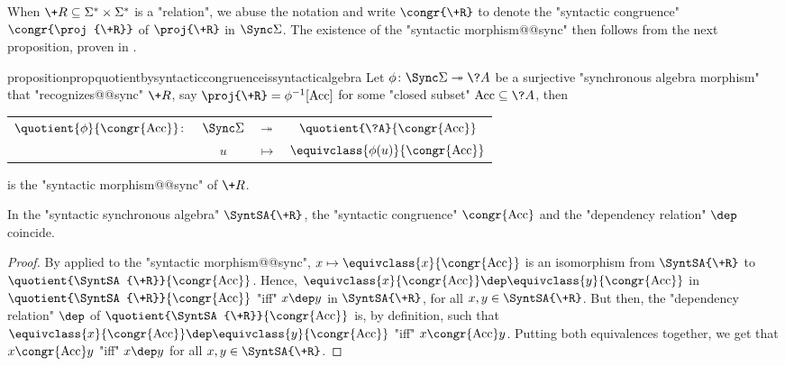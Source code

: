 When $\+R \subseteq \Sigma^* \times\Sigma^*$ is a "relation", we abuse
the notation and write $\congr{\+R}$ to denote
the "syntactic congruence" $\congr{\proj{\+R}}$ of $\proj{\+R}$
in $\Sync\Sigma$.
The existence of the "syntactic morphism@@sync" then follows from
the next proposition, proven in .

\begin{restatable}{proposition}{propquotientbysyntacticcongruenceissyntacticalgebra}
	\AP\label{prop:quotient-by-syntactic-congruence-is-syntactic-algebra}
	Let $\phi\colon \Sync\Sigma \surj \?A$ be a surjective "synchronous algebra morphism"
	that "recognizes@@sync" $\+R$, say $\proj{\+R} = \phi^{-1}[\Acc]$
	for some "closed subset" $\Acc \subseteq \?A$, then 
	\begin{center}
		\begin{tabular}{rccc}
			$\quotient{\phi}{\congr{\Acc}}\colon$
			& $\Sync\Sigma$
			& $\twoheadrightarrow$
			& $\quotient{\?A}{\congr{\Acc}}$\\
			& $u$
			& $\mapsto$
			& $\equivclass{\phi(u)}{\congr{\Acc}}$
		\end{tabular}		
	\end{center}
	is the "syntactic morphism@@sync" of $\+R$.
\end{restatable}

\begin{corollary}
	\AP\label{coro:syntactic-congruence-is-syntactic-dependency}
	In the "syntactic synchronous algebra" $\SyntSA{\+R}$, the "syntactic
	congruence" $\congr{\Acc}$ and the "dependency relation" $\dep$
	coincide. 
\end{corollary}

\begin{proof}
	By 
	applied to the "syntactic morphism@@sync",
	$x \mapsto \equivclass{x}{\congr{\Acc}}$
	is an isomorphism from $\SyntSA{\+R}$ to $\quotient{\SyntSA{\+R}}{\congr{\Acc}}$.
	Hence, $\equivclass{x}{\congr{\Acc}} \dep \equivclass{y}{\congr{\Acc}}$
	in $\quotient{\SyntSA{\+R}}{\congr{\Acc}}$
	"iff" $x \dep y$ in $\SyntSA{\+R}$, for all $x,y \in \SyntSA{\+R}$.
	But then, the "dependency relation" $\dep$ of
	$\quotient{\SyntSA{\+R}}{\congr{\Acc}}$ is, by definition,
	such that $\equivclass{x}{\congr{\Acc}} \dep \equivclass{y}{\congr{\Acc}}$
	"iff" $x \congr{\Acc} y$.
	Putting both equivalences together, we get that
	$x \congr{\Acc} y$ "iff" $x \dep y$ for all $x,y \in \SyntSA{\+R}$.
\end{proof}

